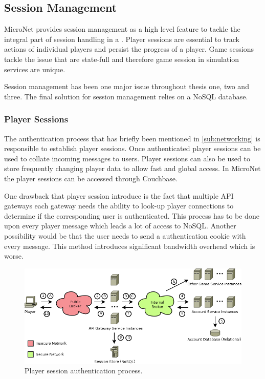 \subsection{Session Management}

MicroNet provides session management as a high level feature to tackle the
integral part of session handling in a \og{}. Player sessions are essential to
track actions of individual players and persist the progress of a player. Game
sessions tackle the issue that \ogs{} are state-full and therefore game session
in simulation services are unique. 

Session management has been one major issue throughout thesis one, two and
three. The final solution for session management relies on a NoSQL database.

\subsubsection{Player Sessions}

The authentication process that has briefly been mentioned in
\autoref{sub:networking} is responsible to establish player sessions. Once
authenticated player sessions can be used to collate incoming messages to users.
Player sessions can also be used to store frequently changing player data to
allow fast and global access. In MicroNet the player sessions can be accessed
through Couchbase.

One drawback that player session introduce is the fact that multiple API
gateways each gateway needs the ability to look-up player connections to
determine if the corresponding user is authenticated. This process has to be
done upon every player message which leads a lot of access to NoSQL. Another
possibility would be that the user needs to send a authentication cookie with
every message. This method introduces significant bandwidth overhead which is
worse. 

\begin{figure}
	\centering
  	\includegraphics[width=\textwidth]{images/architecture/PlayerSessions}
	\caption{Player session authentication process.}
	\label{fig:player_sessions}
\end{figure}

